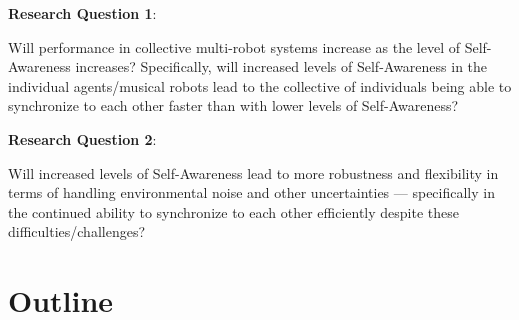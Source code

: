 	\textbf{Research Question 1}:
	
	Will performance in collective multi-robot systems increase as the level of Self-Awareness increases? Specifically, will increased levels of Self-Awareness in the individual agents/musical robots lead to the collective of individuals being able to synchronize to each other faster than with lower levels of Self-Awareness? \nl
	
	\textbf{Research Question 2}:
	
	Will increased levels of Self-Awareness lead to more robustness and flexibility in terms of handling environmental noise and other uncertainties — specifically in the continued ability to synchronize to each other efficiently despite these difficulties/challenges? \nl
	
	
	
	
	
	
	
	\section{Outline}
	

